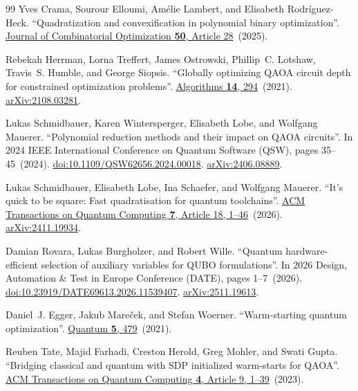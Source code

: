 \documentclass[a4paper,onecolumn,11pt,unpublished]{quantumarticle}
\theoremstyle{remark}
\begin{document}
\begin{thebibliography}{99}
Yves Crama, Sourour Elloumi, Am{\'e}lie Lambert, and Elisabeth Rodr{\'i}guez-Heck.
\newblock ``Quadratization and convexification in polynomial binary optimization''.
\newblock \href{https://dx.doi.org/10.1007/s10878-025-01334-y}{Journal of Combinatorial Optimization {\bf 50}, Article 28}~(2025).

Rebekah Herrman, Lorna Treffert, James Ostrowski, Phillip~C. Lotshaw, Travis~S. Humble, and George Siopsis.
\newblock ``Globally optimizing QAOA circuit depth for constrained optimization problems''.
\newblock \href{https://dx.doi.org/10.3390/a14100294}{Algorithms {\bf 14}, 294}~(2021).
\newblock \href{http://arxiv.org/abs/2108.03281}{arXiv:2108.03281}.

Lukas Schmidbauer, Karen Wintersperger, Elisabeth Lobe, and Wolfgang Mauerer.
\newblock ``Polynomial reduction methods and their impact on QAOA circuits''.
\newblock In 2024 IEEE International Conference on Quantum Software (QSW), pages 35--45~(2024).
\newblock \href{https://dx.doi.org/10.1109/QSW62656.2024.00018}{doi:10.1109/QSW62656.2024.00018}.
\newblock \href{http://arxiv.org/abs/2406.08889}{arXiv:2406.08889}.

Lukas Schmidbauer, Elisabeth Lobe, Ina Schaefer, and Wolfgang Mauerer.
\newblock ``It's quick to be square: Fast quadratisation for quantum toolchains''.
\newblock \href{https://dx.doi.org/10.1145/3800943}{ACM Transactions on Quantum Computing {\bf 7}, Article 18, 1--46}~(2026).
\newblock \href{http://arxiv.org/abs/2411.19934}{arXiv:2411.19934}.

Damian Rovara, Lukas Burgholzer, and Robert Wille.
\newblock ``Quantum hardware-efficient selection of auxiliary variables for QUBO formulations''.
\newblock In 2026 Design, Automation \& Test in Europe Conference (DATE), pages 1--7~(2026).
\newblock \href{https://dx.doi.org/10.23919/DATE69613.2026.11539407}{doi:10.23919/DATE69613.2026.11539407}.
\newblock \href{http://arxiv.org/abs/2511.19613}{arXiv:2511.19613}.

Daniel~J. Egger, Jakub Mare{\v c}ek, and Stefan Woerner.
\newblock ``Warm-starting quantum optimization''.
\newblock \href{https://dx.doi.org/10.22331/q-2021-06-17-479}{Quantum {\bf 5}, 479}~(2021).

Reuben Tate, Majid Farhadi, Creston Herold, Greg Mohler, and Swati Gupta.
\newblock ``Bridging classical and quantum with SDP initialized warm-starts for QAOA''.
\newblock \href{https://dx.doi.org/10.1145/3549554}{ACM Transactions on Quantum Computing {\bf 4}, Article 9, 1--39}~(2023).


\end{thebibliography}
\end{document}
